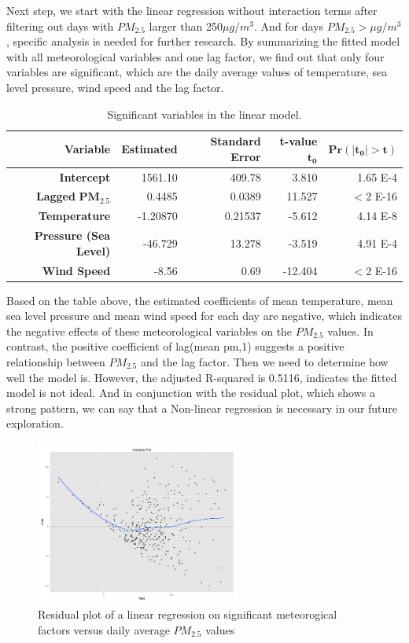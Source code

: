 \documentclass[11pt]{article} %
\begin{document}
 
 Next step, we start with the linear regression without interaction terms after filtering out days with \(PM_{2.5}\) larger than 250\(\mu g/m^3\). And for days \(PM_{2.5}>\mu g/m^3\), specific analysis is needed for further research. 
By summarizing the fitted model with all meteorological variables and one lag factor, we find out that only four variables are significant, which are the daily average values of temperature, sea level pressure, wind speed and the lag factor.
 
 \begin{table}
 \begin{tabular} {| r | r | r | r | r |}
 \hline
 \textbf{Variable} & 
\textbf{Estimated} & 
\textbf{Standard Error} & 
\textbf{t-value} \(\mathbf{t_0}\) & 
\(\mathbf{Pr(\vert t_0 \vert >t)}\) \\ \hline
\textbf{Intercept} & 1561.10 & 409.78 & 3.810 & 1.65 E-4 \\ \hline
\textbf{Lagged }\(\mathbf{PM_{2.5}}\) & 0.4485 & 0.0389 & 11.527 & \(<\)2 E-16 \\ \hline
\textbf{Temperature} & -1.20870 & 0.21537 & -5.612 & 4.14 E-8 \\ \hline
\textbf{Pressure (Sea Level)} & -46.729 & 13.278 & -3.519 & 4.91 E-4 \\ \hline
\textbf{Wind Speed} & -8.56 & 0.69 & -12.404 & \(<\)2 E-16 \\ \hline
 \end{tabular}
 \caption{Significant variables in the linear model.}
 \end{table}
 
Based on the table above, the estimated coefficients of mean temperature, mean sea level pressure and mean wind speed for each day are negative, which indicates the negative effects of these meteorological variables on the \(PM_{2.5}\) values. In contrast, the positive coefficient of lag(mean pm,1) suggests a positive relationship between \(PM_{2.5}\) and the lag factor.
Then we need to determine how well the model is. However, the adjusted R-squared is 0.5116, indicates the fitted model is not ideal. And in conjunction with the residual plot, which shows a strong pattern, we can say that a Non-linear regression is necessary in our future exploration. 

 


 \begin{figure}[!ht]
  \centering
    \includegraphics[width=0.6\textwidth]{Figure2-2}
      \caption{Residual plot of a linear regression on significant meteorogical factors versus daily average \(PM_{2.5}\) values}
\end{figure}
\end{document}
